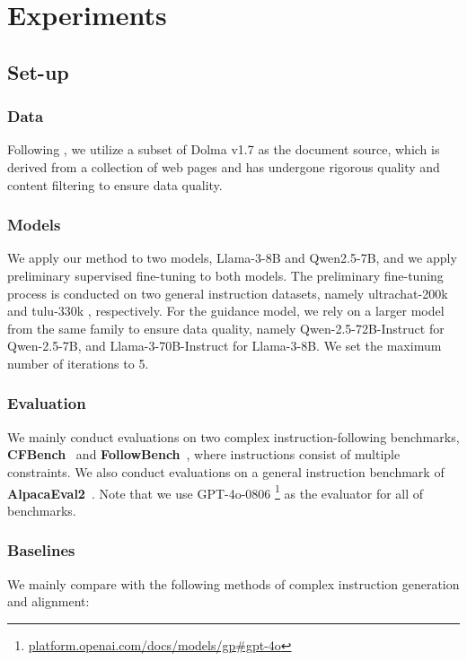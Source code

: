 \section{Experiments}
\subsection{Set-up}

\subsubsection{Data} 
Following \citet{nguyen2024better}, we utilize a subset of Dolma v1.7 \citep{dolma-2024} as the document source, which is derived from a collection of web pages and has undergone rigorous quality and content filtering to ensure data quality.

\subsubsection{Models} 
\label{sec:models}
We apply our method to two models, Llama-3-8B and Qwen2.5-7B, and we apply preliminary supervised fine-tuning to both models. The preliminary fine-tuning process is conducted on two general instruction datasets, namely ultrachat-200k \citep{ding2023enhancing} and tulu-330k \citep{lambert2024tulu3}, respectively. For the guidance model, we rely on a larger model from the same family to ensure data quality, namely Qwen-2.5-72B-Instruct for Qwen-2.5-7B, and Llama-3-70B-Instruct for Llama-3-8B. We set the maximum number of iterations to 5.

\subsubsection{Evaluation} 
We mainly conduct evaluations on two complex instruction-following benchmarks, \textbf{CFBench}~\citep{zhang2024cfbench} and \textbf{FollowBench}~\citep{jiang2023followbench}, where instructions consist of multiple constraints. We also conduct evaluations on a general instruction benchmark of \textbf{AlpacaEval2}~\citep{dubois2024length}. Note that we use GPT-4o-0806 \footnote{\url{platform.openai.com/docs/models/gp\#gpt-4o}} as the evaluator for all of benchmarks. 

\subsubsection{Baselines}
We mainly compare with the following methods of complex instruction generation and alignment:

